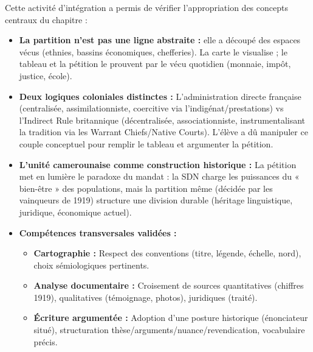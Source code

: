 \documentclass[11pt]{article}
\newcommand{\cle}[1]{{\popxbold\color{popdark}#1}}
\newcounter{popsec}
\newcounter{popsub}
\newcommand{\courssub}[1]{%
  \stepcounter{popsub}%
  \par\vspace{9pt}\noindent{\popxbold\fontsize{11.5}{13}\selectfont\color{popink}{\color{poporange}\thepopsec.\thepopsub}\hspace{6pt}#1}\par\nopagebreak\vspace{4pt}
}
\begin{document}
\courssub{Bilan de l'activité}
\noindent Cette activité d'intégration a permis de vérifier l'appropriation des concepts centraux du chapitre :
\begin{itemize}
    \item \textbf{La partition n'est pas une ligne abstraite :} elle a découpé des espaces vécus (ethnies, bassins économiques, chefferies). La carte le visualise ; le tableau et la pétition le prouvent par le vécu quotidien (monnaie, impôt, justice, école).
    \item \textbf{Deux logiques coloniales distinctes :} L'\cle{administration directe française} (centralisée, assimilationniste, coercitive via l'indigénat/prestations) vs l'\cle{Indirect Rule britannique} (décentralisée, associationniste, instrumentalisant la tradition via les Warrant Chiefs/Native Courts). L'élève a dû manipuler ce couple conceptuel pour remplir le tableau et argumenter la pétition.
    \item \textbf{L'unité camerounaise comme construction historique :} La pétition met en lumière le paradoxe du mandat : la SDN charge les puissances du « bien-être » des populations, mais la partition même (décidée par les vainqueurs de 1919) structure une division durable (héritage linguistique, juridique, économique actuel).
    \item \textbf{Compétences transversales validées :}
    \begin{itemize}
        \item \textbf{Cartographie :} Respect des conventions (titre, légende, échelle, nord), choix sémiologiques pertinents.
        \item \textbf{Analyse documentaire :} Croisement de sources quantitatives (chiffres 1919), qualitatives (témoignage, photos), juridiques (traité).
        \item \textbf{Écriture argumentée :} Adoption d'une posture historique (énonciateur situé), structuration thèse/arguments/nuance/revendication, vocabulaire précis.
    \end{itemize}
\end{itemize}
\end{document}
